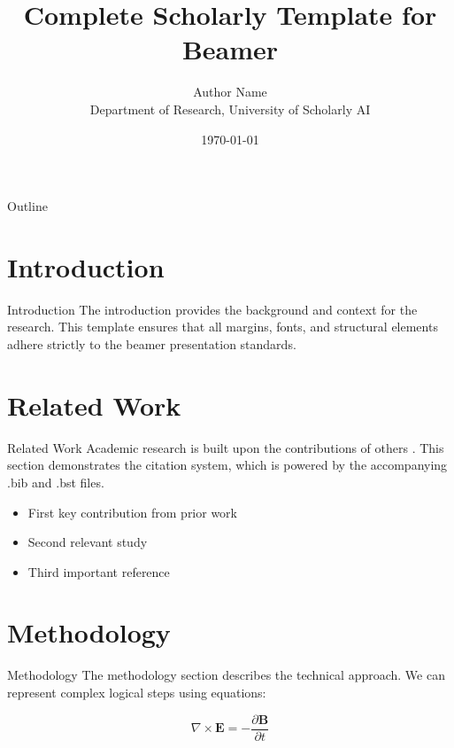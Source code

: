 ﻿\documentclass{beamer}
\title{Complete Scholarly Template for Beamer}
\author{Author Name \\ \small Department of Research, University of Scholarly AI}
\date{\today}
\institute{Scholarly AI}
\begin{document}
\begin{frame}
  \titlepage
\end{frame}

\begin{frame}{Outline}
  \tableofcontents
\end{frame}

\section{Introduction}
\begin{frame}{Introduction}
  The introduction provides the background and context for the research. This template ensures that all margins, fonts, and structural elements adhere strictly to the beamer presentation standards.
\end{frame}

\section{Related Work}
\begin{frame}{Related Work}
  Academic research is built upon the contributions of others \citep{knuth1984,lamport1994}. This section demonstrates the citation system, which is powered by the accompanying .bib and .bst files.

  \begin{itemize}
    \item First key contribution from prior work \citep{einstein1905}
    \item Second relevant study
    \item Third important reference
  \end{itemize}
\end{frame}

\section{Methodology}
\begin{frame}{Methodology}
  The methodology section describes the technical approach. We can represent complex logical steps using equations:

  \begin{equation}
      \nabla \times \mathbf{E} = -\frac{\partial \mathbf{B}}{\partial t}
  \end{equation}
\end{frame}
\end{document}
